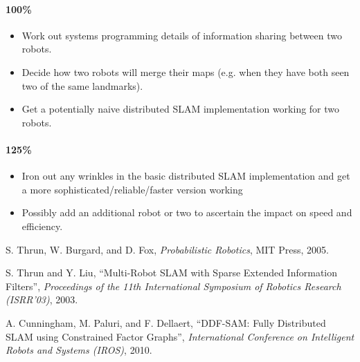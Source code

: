 \documentclass[11pt]{article}
\begin{document}
\paragraph{100\%}

\begin{itemize}
    \item Work out systems programming details of information sharing between two robots.
    \item Decide how two robots will merge their maps (e.g. when they have both seen two of the same landmarks).
    \item Get a potentially naive distributed SLAM implementation working for two robots.
\end{itemize}

\paragraph{125\%}
\begin{itemize}
    \item Iron out any wrinkles in the basic distributed SLAM implementation and get a more sophisticated/reliable/faster version working
    \item Possibly add an additional robot or two to ascertain the impact on speed and efficiency.
\end{itemize}

\begin{thebibliography}{12}
        S. Thrun, W. Burgard, and D. Fox, \emph{Probabilistic Robotics}, MIT Press, 2005.

        S. Thrun and Y. Liu, ``Multi-Robot SLAM with Sparse Extended Information Filters'', \emph{Proceedings of the 11th International Symposium of Robotics Research (ISRR'03)}, 2003.

        A. Cunningham, M. Paluri, and F. Dellaert, ``DDF-SAM: Fully Distributed SLAM using Constrained Factor Graphs'', \emph{International Conference on Intelligent Robots and Systems (IROS)}, 2010.

\end{thebibliography}
\end{document}
